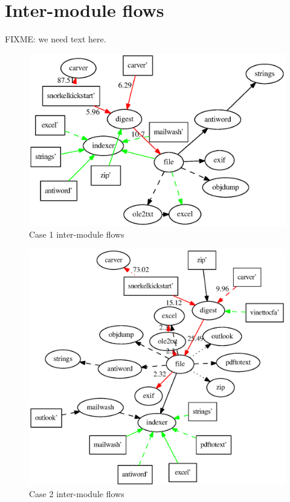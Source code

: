 \section{Inter-module flows}
FIXME: we need text here.
\begin{figure}
  \centering
  \includegraphics[width=130mm]{ocfa/step5/stripped1_modules.eps}
  \caption{Case 1 inter-module flows}
\end{figure}
\begin{figure}
  \centering
  \includegraphics[width=130mm]{ocfa/step5/stripped2_modules.eps}
  \caption{Case 2 inter-module flows}
\end{figure}
